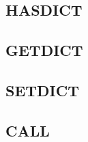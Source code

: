 \subsection{HAS\textunderscore{}DICT}
\label{sec:hasdict}


\subsection{GET\textunderscore{}DICT}
\label{sec:getdict}


\subsection{SET\textunderscore{}DICT}
\label{sec:setdict}


\subsection{CALL}
\label{sec:call}


